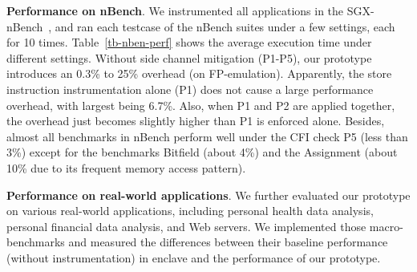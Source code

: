 \vspace{3pt}\noindent\textbf{Performance on nBench}. We instrumented all applications in the SGX-nBench~\cite{sgxnbench}, and ran each testcase of the nBench suites under a few settings, each for 10 times. 
Table~\ref{tb-nben-perf} shows the average execution time under different settings.
Without side channel mitigation (P1-P5), our prototype introduces an 0.3\% to 25\% overhead (on FP-emulation). %
Apparently, the store instruction instrumentation alone (P1) does not cause a large performance overhead, with \DIFaddbegin {}\DIFaddend largest being 6.7\%. Also, when P1 and P2 are applied together, the overhead just becomes slightly higher than P1 is enforced alone. %
\DIFaddbegin {}\DIFaddend Besides, almost all benchmarks in nBench perform well under the CFI check P5 (less than 3\%) except for the benchmarks Bitfield (about 4\%) and the Assignment (about 10\% due to its frequent memory access pattern).

\vspace{3pt}\noindent\textbf{Performance on real-world applications}.  We further evaluated our prototype on various real-world applications, including personal health data analysis, personal financial data analysis, and Web servers. 
We implemented those macro-benchmarks and measured the differences between their baseline performance (without instrumentation) in enclave and the performance of our prototype.
\DIFaddbegin {}\DIFaddend 

